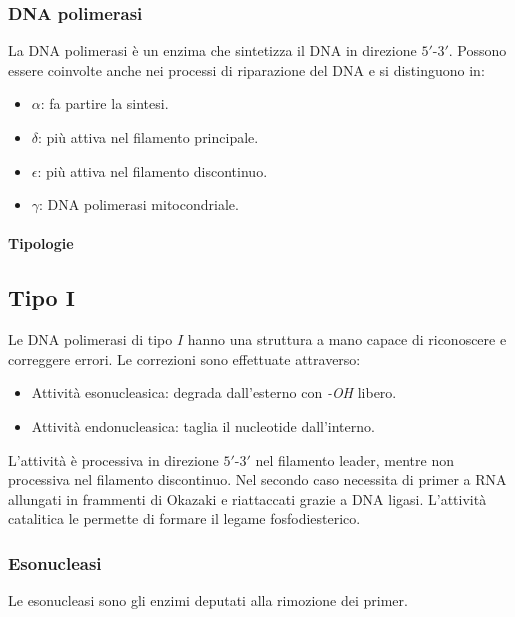 		\subsubsection{DNA polimerasi}
		La DNA polimerasi \`e un enzima che sintetizza il DNA in direzione $5'$-$3'$.
		Possono essere coinvolte anche nei processi di riparazione del DNA e si distinguono in:
		\begin{multicols}{2}
			\begin{itemize}
				\item $\alpha$: fa partire la sintesi.
				\item $\delta$: pi\`u attiva nel filamento principale.
				\item $\epsilon$: pi\`u attiva nel filamento discontinuo.
				\item $\gamma$: DNA polimerasi mitocondriale.
			\end{itemize}
		\end{multicols}

			\paragraph{Tipologie}

				\subsection{Tipo $\mathbf{I}$}
				Le DNA polimerasi di tipo $I$ hanno una struttura a mano capace di riconoscere e correggere errori.
				Le correzioni sono effettuate attraverso:
				\begin{multicols}{2}
					\begin{itemize}
						\item Attivit\`a esonucleasica: degrada dall'esterno con \emph{-OH} libero.
						\item Attivit\`a endonucleasica: taglia il nucleotide dall'interno.
					\end{itemize}
				\end{multicols}
				L'attivit\`a \`e processiva in direzione $5'$-$3'$ nel filamento leader, mentre non processiva nel filamento discontinuo.
				Nel secondo caso necessita di primer a RNA allungati in frammenti di Okazaki e riattaccati grazie a DNA ligasi.
				L'attivit\`a catalitica le permette di formare il legame fosfodiesterico.

		\subsubsection{Esonucleasi}
		Le esonucleasi sono gli enzimi deputati alla rimozione dei primer.
		
